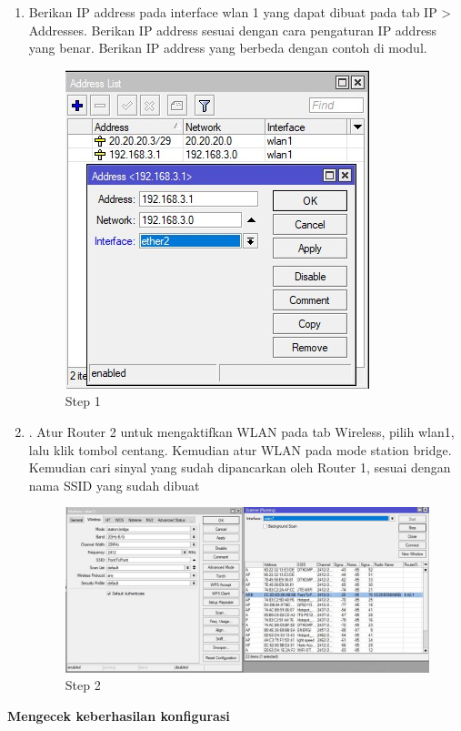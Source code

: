 \begin{enumerate}
	\item Berikan IP address pada interface wlan 1 yang dapat dibuat pada tab IP > Addresses. Berikan
	IP address sesuai dengan cara pengaturan IP address yang benar. Berikan IP address yang
	berbeda dengan contoh di modul.
	\begin{figure}[H]
		\centering
		\includegraphics[width=0.5\linewidth]{P1/img/per2pc2step1.jpg}
		\caption{Step 1}
		\label{fig:gambar12}
	\end{figure}

	\item . Atur Router 2 untuk mengaktifkan WLAN pada tab Wireless, pilih wlan1, lalu klik tombol centang. 
	Kemudian atur WLAN pada mode station bridge. Kemudian cari sinyal yang sudah dipancarkan
	oleh Router 1, sesuai dengan nama SSID yang sudah dibuat
	
	\begin{figure}[H]
		\centering
		\includegraphics[width=0.5\linewidth]{P1/img/per2pc2step2.jpg}
		\caption{Step 2}
		\label{fig:gambar13}
	\end{figure}

\end{enumerate}

\begin{center} 
	\textbf{Mengecek keberhasilan konfigurasi}
\end{center}

